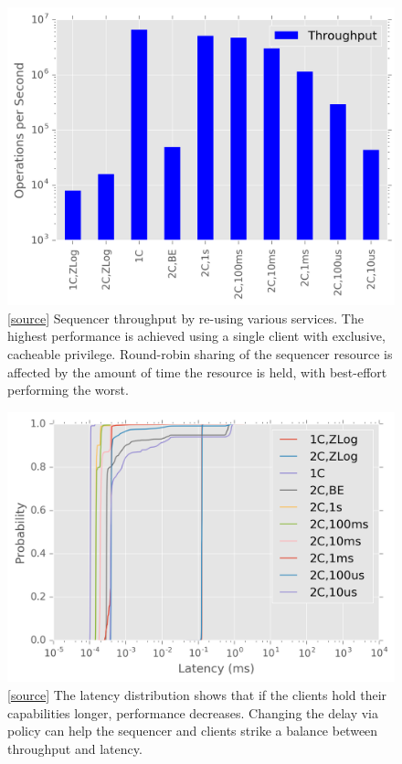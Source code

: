 \documentclass[preprint]{sigplanconf-eurosys}
\begin{document}
\begin{figure}[h]
\centering
\includegraphics{figures/caps-delay-thruput.png}
\caption{[\href{https://github.com/double-blind-submitter/osdi16}{source}]
Sequencer throughput by re-using various services.  The highest performance is
achieved using a single client with exclusive, cacheable privilege. Round-robin
sharing of the sequencer resource is affected by the amount of time the
resource is held, with best-effort performing the worst.}
\label{fig:captp}
\end{figure}

\begin{figure}[h]
\centering
\includegraphics{figures/caps-delay-latency.png}
\caption{[\href{https://github.com/double-blind-submitter/osdi16}{source}] The
latency distribution shows that if the clients hold their capabilities longer,
performance decreases. Changing the delay via policy can help the sequencer and
clients strike a balance between throughput and latency.}
\label{fig:capcdf}
\end{figure}
\end{document}
